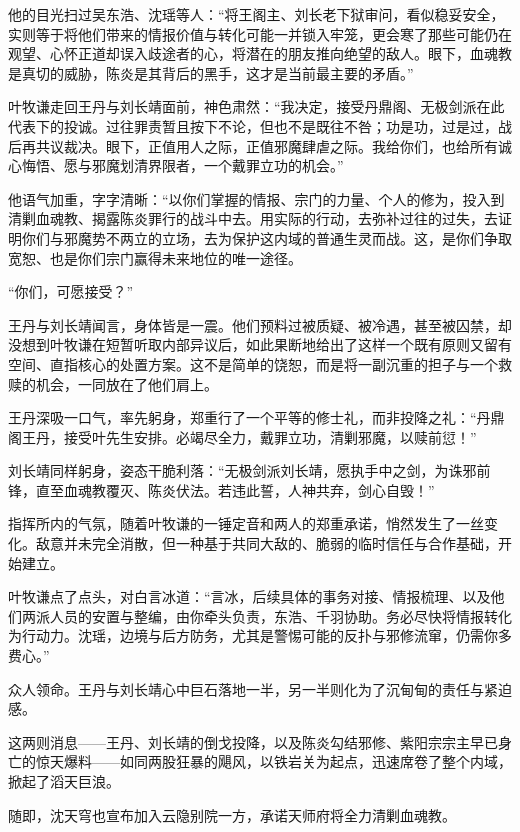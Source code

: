 他的目光扫过吴东浩、沈瑶等人：“将王阁主、刘长老下狱审问，看似稳妥安全，实则等于将他们带来的情报价值与转化可能一并锁入牢笼，更会寒了那些可能仍在观望、心怀正道却误入歧途者的心，将潜在的朋友推向绝望的敌人。眼下，血魂教是真切的威胁，陈炎是其背后的黑手，这才是当前最主要的矛盾。”

叶牧谦走回王丹与刘长靖面前，神色肃然：“我决定，接受丹鼎阁、无极剑派在此代表下的投诚。过往罪责暂且按下不论，但也不是既往不咎；功是功，过是过，战后再共议裁决。眼下，正值用人之际，正值邪魔肆虐之际。我给你们，也给所有诚心悔悟、愿与邪魔划清界限者，一个戴罪立功的机会。”

他语气加重，字字清晰：“以你们掌握的情报、宗门的力量、个人的修为，投入到清剿血魂教、揭露陈炎罪行的战斗中去。用实际的行动，去弥补过往的过失，去证明你们与邪魔势不两立的立场，去为保护这内域的普通生灵而战。这，是你们争取宽恕、也是你们宗门赢得未来地位的唯一途径。

\vspace{2em}

“你们，可愿接受？”

\vspace{2em}

王丹与刘长靖闻言，身体皆是一震。他们预料过被质疑、被冷遇，甚至被囚禁，却没想到叶牧谦在短暂听取内部异议后，如此果断地给出了这样一个既有原则又留有空间、直指核心的处置方案。这不是简单的饶恕，而是将一副沉重的担子与一个救赎的机会，一同放在了他们肩上。

王丹深吸一口气，率先躬身，郑重行了一个平等的修士礼，而非投降之礼：“丹鼎阁王丹，接受叶先生安排。必竭尽全力，戴罪立功，清剿邪魔，以赎前愆！”

刘长靖同样躬身，姿态干脆利落：“无极剑派刘长靖，愿执手中之剑，为诛邪前锋，直至血魂教覆灭、陈炎伏法。若违此誓，人神共弃，剑心自毁！”

指挥所内的气氛，随着叶牧谦的一锤定音和两人的郑重承诺，悄然发生了一丝变化。敌意并未完全消散，但一种基于共同大敌的、脆弱的临时信任与合作基础，开始建立。

叶牧谦点了点头，对白言冰道：“言冰，后续具体的事务对接、情报梳理、以及他们两派人员的安置与整编，由你牵头负责，东浩、千羽协助。务必尽快将情报转化为行动力。沈瑶，边境与后方防务，尤其是警惕可能的反扑与邪修流窜，仍需你多费心。”

众人领命。王丹与刘长靖心中巨石落地一半，另一半则化为了沉甸甸的责任与紧迫感。

这两则消息——王丹、刘长靖的倒戈投降，以及陈炎勾结邪修、紫阳宗宗主早已身亡的惊天爆料——如同两股狂暴的飓风，以铁岩关为起点，迅速席卷了整个内域，掀起了滔天巨浪。

随即，沈天穹也宣布加入云隐别院一方，承诺天师府将全力清剿血魂教。

